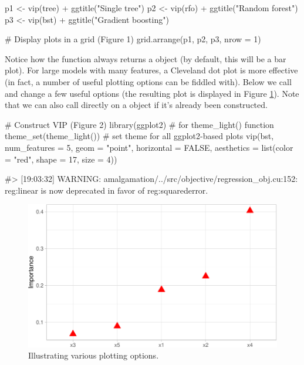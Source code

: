 \begin{Schunk}
\begin{Sinput}
p1 <- vip(tree) + ggtitle("Single tree")
p2 <- vip(rfo) + ggtitle("Random forest")
p3 <- vip(bst) + ggtitle("Gradient boosting")

# Display plots in a grid (Figure 1)
grid.arrange(p1, p2, p3, nrow = 1)
\end{Sinput}
\end{Schunk}

Notice how the  function always returns a 
object (by default, this will be a bar plot). For large models with many
features, a Cleveland dot plot is more effective (in fact, a number of
useful plotting options can be fiddled with). Below we call 
and change a few useful options (the resulting plot is displayed in
Figure \ref{fig:dot-plot}). Note that we can also call 
directly on a  object if it's already been constructed.

\begin{Schunk}
\begin{Sinput}
# Construct VIP (Figure 2)
library(ggplot2)  # for theme_light() function
theme_set(theme_light())  # set theme for all ggplot2-based plots
vip(bst, num_features = 5, geom = "point", horizontal = FALSE, 
    aesthetics = list(color = "red", shape = 17, size = 4)) 
\end{Sinput}
\begin{Soutput}
#> [19:03:32] WARNING: amalgamation/../src/objective/regression_obj.cu:152: reg:linear is now deprecated in favor of reg:squarederror.
\end{Soutput}
\begin{figure}[!htb]

{\centering \includegraphics[width=0.7\linewidth]{greenwell-boehmke_files/figure-latex/dot-plot-1} 

}

\caption[Illustrating various plotting options]{Illustrating various plotting options.}\label{fig:dot-plot}
\end{figure}
\end{Schunk}

